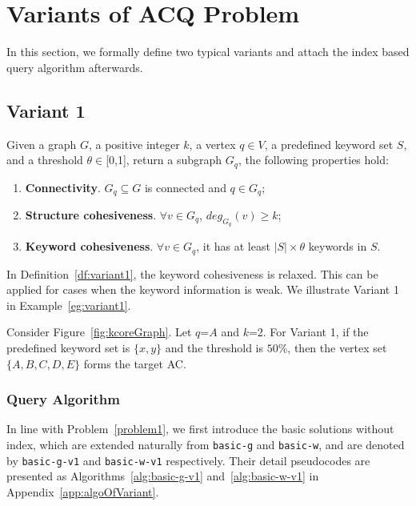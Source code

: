 \section{Variants of ACQ Problem}
\label{app:variant}

In this section, we formally define two typical variants and attach the index based query algorithm afterwards.


\subsection{Variant 1}
\begin{definition}
\label{df:variant1}
Given a graph $G$, a positive integer $k$, a vertex $q \in V$, a predefined keyword set $S$,
and a threshold $\theta\in$[0,1], return a subgraph $G_q$, the following properties hold:
  \begin{enumerate}
    \item \textbf{Connectivity}. $G_q \subseteq G$ is connected and $q\in G_q$;
    \item \textbf{Structure cohesiveness}. $\forall v\in G_q$, $deg_{G_q}(v)\geq k$;
    \item \textbf{Keyword cohesiveness}. $\forall v\in G_q$, it has at least $|S|\times \theta$ keywords in $S$.
  \end{enumerate}
\end{definition}

In Definition~\ref{df:variant1}, the keyword cohesiveness is relaxed.
This can be applied for cases when the keyword information is weak.
We illustrate Variant 1 in Example~\ref{eg:variant1}.
\begin{example}
\label{eg:variant1}
Consider Figure~\ref{fig:kcoreGraph}. Let $q$=$A$ and $k$=2.
For Variant 1, if the predefined keyword set is $\{x,y\}$
and the threshold is $50\%$,
then the vertex set $\{A,B,C,D,E\}$ forms the target AC.
\end{example}

\subsubsection{Query Algorithm}
In line with Problem~\ref{problem1}, we first introduce the basic solutions without index,
which are extended naturally from {\tt basic-g} and {\tt basic-w},
and are denoted by {\tt basic-g-v1} and {\tt basic-w-v1} respectively.
Their detail pseudocodes are presented as Algorithms~\ref{alg:basic-g-v1} and~\ref{alg:basic-w-v1} in Appendix~\ref{app:algoOfVariant}.

